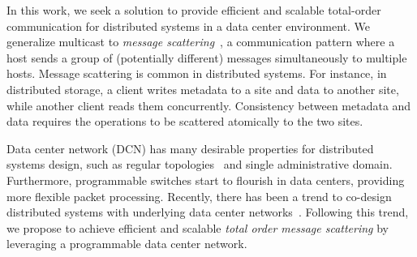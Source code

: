 In this work, we seek a solution to provide efficient and scalable total-order communication for distributed systems in a data center environment. We generalize multicast to \textit{message scattering}~\cite{kshemkalyani2011distributed}, a communication pattern where a host sends a group of (potentially different) messages simultaneously to multiple hosts.
Message scattering is common in distributed systems.
For instance, in distributed storage, a client writes metadata to a site and data to another site, while another client reads them concurrently. Consistency between metadata and data requires the operations to be scattered atomically to the two sites.



Data center network (DCN) has many desirable properties for distributed systems design, such as regular topologies~\cite{leiserson1985fat,greenberg2009vl2} and single administrative domain. Furthermore, programmable switches start to flourish in data centers, providing more flexible packet processing. Recently, there has been a trend to co-design distributed systems with underlying data center networks~\cite{eris,netcache-sosp17,dang2016paxos}. Following this trend, we propose \sys to achieve efficient and scalable \textit{total order message scattering} by leveraging a programmable data center network.

